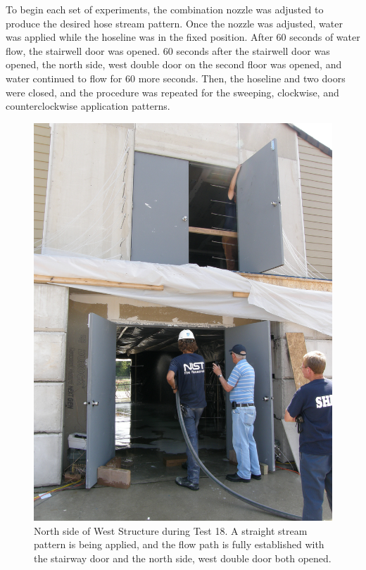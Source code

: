 \documentclass[12pt,oneside]{book}
\begin{document}
To begin each set of experiments, the combination nozzle was adjusted to produce the desired hose stream pattern. Once the nozzle was adjusted, water was applied while the hoseline was in the fixed position. After 60 seconds of water flow, the stairwell door was opened. 60 seconds after the stairwell door was opened, the north side, west double door on the second floor was opened, and water continued to flow for 60 more seconds. Then, the hoseline and two doors were closed, and the procedure was repeated for the sweeping, clockwise, and counterclockwise application patterns.

\begin{figure}[!ht]
\includegraphics[width=6in]{../../Figures/Test_18}
\caption[North Side of West Structure during Test 18]{North side of West Structure during Test 18. A straight stream pattern is being applied, and the flow path is fully established with the stairway door and the north side, west double door both opened.}
\label{fig:test_18_pic}
\end{figure}
\end{document}
